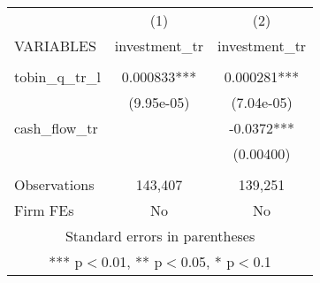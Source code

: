 \begin{tabular}{lcc} \hline
 & (1) & (2) \\
VARIABLES & investment\_tr & investment\_tr \\ \hline
 &  &  \\
tobin\_q\_tr\_l & 0.000833*** & 0.000281*** \\
 & (9.95e-05) & (7.04e-05) \\
cash\_flow\_tr &  & -0.0372*** \\
 &  & (0.00400) \\
 &  &  \\
Observations & 143,407 & 139,251 \\
 Firm FEs & No & No \\ \hline
\multicolumn{3}{c}{ Standard errors in parentheses} \\
\multicolumn{3}{c}{ *** p$<$0.01, ** p$<$0.05, * p$<$0.1} \\
\end{tabular}
